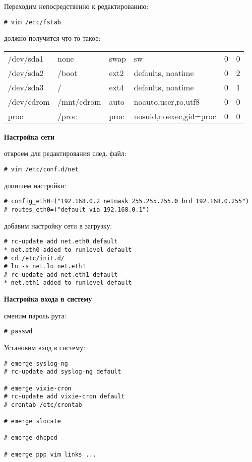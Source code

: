 \documentclass[12pt, a4paper]{article}
\begin{document}
Переходим непосредственно к редактированию:

\begin{verbatim}
# vim /etc/fstab
\end{verbatim}

должно получится что то такое:
\newline

\begin{tabular}{llllcc}
/dev/sda1 & none & swap & sw & 0 & 0 \\
/dev/sda2 & /boot & ext2 & defaults, noatime & 0 & 2\\
/dev/sda3 & / & ext4 & defaults, noatime & 0 & 1 \\
/dev/cdrom& /mnt/cdrom & auto & noauto,user,ro,utf8 & 0 & 0 \\
proc & /proc & proc & nosuid,noexec,gid=proc & 0 & 0 \\
\end{tabular}

{\bf Настройка сети}

откроем для редактирования след. файл:

\begin{verbatim}
# vim /etc/conf.d/net
\end{verbatim}

допишем настройки:

\begin{verbatim}
# config_eth0=("192.168.0.2 netmask 255.255.255.0 brd 192.168.0.255")
# routes_eth0=("default via 192.168.0.1")
\end{verbatim}

добавим настройку сети в загрузку:

\begin{verbatim}
# rc-update add net.eth0 default
* net.eth0 added to runlevel default
# cd /etc/init.d/
# ln -s net.lo net.eth1
# rc-update add net.eth1 default
* net.eth1 added to runlevel default
\end{verbatim}


{\bf Настройка входа в систему}

сменим пароль рута:

\begin{verbatim}
# passwd
\end{verbatim}

Установим вход в систему:

\begin{verbatim}
# emerge syslog-ng
# rc-update add syslog-ng default

# emerge vixie-cron
# rc-update add vixie-cron default
# crontab /etc/crontab

# emerge slocate

# emerge dhcpcd

# emerge ppp vim links ...
\end{verbatim}
\end{document}
